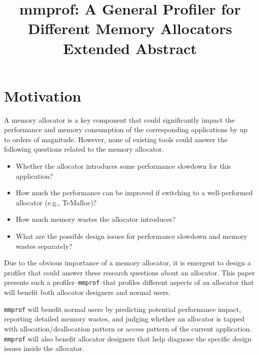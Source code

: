 \documentclass[pageno]{jpaper}
\newcommand{\MP}{\texttt{mmprof}}
\begin{document}
\title{mmprof: A General Profiler for Different Memory Allocators\\ \textbf{Extended Abstract}}

\date{}

\maketitle



\section{Motivation}
\label{sec:motivation}

A memory allocator is a key component that could significantly impact the performance and memory consumption of the corresponding applications by up to orders of magnitude. However, none of existing tools could answer the following questions related to the memory allocator. \\

\begin{itemize}
\item Whether the allocator introduces   some performance slowdown for this application? 
\item How much the performance can be improved if switching to a well-performed allocator (e.g., TcMalloc)?
\item How much memory wastes the allocator introduces?
\item What are the possible design issues for performance slowdown and memory wastes separately? 
\end{itemize}
\vspace{0.1in}

Due to the obvious importance of a memory allocator, it is emergent to design a profiler that could answer these research questions about an allocator. This paper presents such a profiler--\MP{}--that profiles different aspects of an allocator that will benefit both allocator designers and normal users. 

\MP{} will benefit normal users by predicting potential performance impact, reporting detailed memory wastes, and judging whether an allocator is tapped with allocation/deallocation pattern or access pattern of the current application. \MP{} will also benefit allocator designers that help diagnose the specific design issues inside the allocator. 
\end{document}
